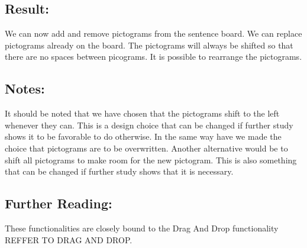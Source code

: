 

\subsection{Result:}
We can now add and remove pictograms from the sentence board. We can replace pictograms already on the board. The pictograms will always be shifted so that there are no spaces between picograms. It is possible to rearrange the pictograms.


\subsection{Notes:}
It should be noted that we have chosen that the pictograms shift to the left whenever they can. This is a design choice that can be changed if further study shows it to be favorable to do otherwise. 
In the same way have we made the choice that pictograms are to be overwritten. Another alternative would be to shift all pictograms to make room for the new pictogram. This is also something that can be changed if further study shows that it is necessary.


\subsection{Further Reading:}
These functionalities are closely bound to the Drag And Drop functionality REFFER TO DRAG AND DROP.